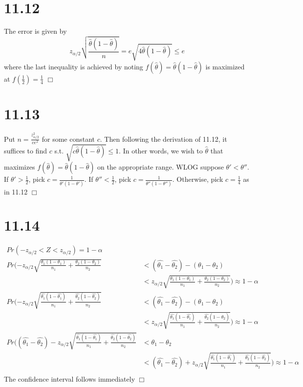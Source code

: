 \documentclass{article}
\begin{document}
\section*{11.12}
The error is given by
$$z_{\alpha/2}\sqrt{\frac{\hat{\theta}(1-\hat{\theta})}{n}} = e\sqrt{4\hat{\theta}(1-\hat{\theta})} \leqslant e$$
where the last inequality is achieved by noting $f(\hat{\theta}) = \hat{\theta}(1-\hat{\theta})$ is maximized at $f(\frac{1}{2}) = \frac{1}{4}$ $\Box$

\section*{11.13}
Put $n = \frac{z^2_{\alpha/2}}{ce^2}$ for some constant $c$. Then following the derivation of 11.12, it suffices to find $c$ s.t. $\sqrt{c\hat{\theta}(1-\hat{\theta})} \leq 1$. In other words, we wish to $\hat{\theta}$ that maximizes $f(\hat{\theta}) = \hat{\theta}(1-\hat{\theta})$ on the appropriate range. WLOG suppose $\theta' < \theta''$. If $\theta' > \frac{1}{2}$, pick $c = \frac{1}{\theta'(1-\theta')}$. If $\theta'' < \frac{1}{2}$, pick $c = \frac{1}{\theta''(1-\theta'')}$. Otherwise, pick $c = \frac{1}{4}$ as in 11.12 $\Box$

\section*{11.14}
\begin{equation*}
\begin{split}
Pr(-z_{\alpha/2} < Z < z_{\alpha/2}) = 1-\alpha\\
Pr(-z_{\alpha/2}\sqrt{\frac{\theta_1(1-\theta_1)}{n_1} + \frac{\theta_2(1-\theta_2)}{n_2}} &< (\hat{\theta_1} - \hat{\theta_2}) - (\theta_1-\theta_2)\\
&< z_{\alpha/2}\sqrt{\frac{\theta_1(1-\theta_1)}{n_1} + \frac{\theta_2(1-\theta_2)}{n_2}}) \approx 1-\alpha\\
Pr(-z_{\alpha/2}\sqrt{\frac{\hat{\theta_1}(1-\hat{\theta_1})}{n_1} + \frac{\hat{\theta_2}(1-\hat{\theta_2})}{n_2}} &< (\hat{\theta_1} - \hat{\theta_2}) - (\theta_1-\theta_2)\\
&< z_{\alpha/2}\sqrt{\frac{\hat{\theta_1}(1-\hat{\theta_1})}{n_1} + \frac{\hat{\theta_2}(1-\hat{\theta_2})}{n_2}}) \approx 1-\alpha\\
Pr((\hat{\theta_1} - \hat{\theta_2}) - z_{\alpha/2}\sqrt{\frac{\hat{\theta_1}(1-\hat{\theta_1})}{n_1} + \frac{\hat{\theta_2}(1-\hat{\theta_2})}{n_2}} &< \theta_1-\theta_2\\
&< (\hat{\theta_1} - \hat{\theta_2}) + z_{\alpha/2}\sqrt{\frac{\hat{\theta_1}(1-\hat{\theta_1})}{n_1} + \frac{\hat{\theta_2}(1-\hat{\theta_2})}{n_2}}) \approx 1-\alpha\\
\end{split}
\end{equation*}
The confidence interval follows immediately $\Box$
\end{document}
